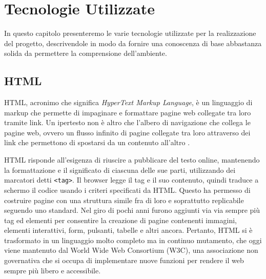 \clearpage{\pagestyle{empty}\cleardoublepage}
\chapter{Tecnologie Utilizzate}
In questo capitolo presenteremo le varie tecnologie utilizzate per la realizzazione del progetto, descrivendole in modo da fornire una conoscenza di base abbastanza solida da permettere la comprensione dell'ambiente.

\section{HTML}
HTML, acronimo che significa \textit{HyperText Markup Language}, è un linguaggio di markup che permette di impaginare e formattare pagine web collegate tra loro tramite link. Un ipertesto non è altro che l'albero di navigazione che collega le pagine web, ovvero un flusso infinito di pagine collegate tra loro attraverso dei link che permettono di spostarsi da un contenuto all'altro \cite{HTML, HTML_Mozilla}.

HTML risponde all'esigenza di riuscire a pubblicare del testo online, mantenendo la formattazione e il significato di ciascuna delle sue parti, utilizzando dei marcatori detti \Verb_<tag>_. Il browser legge il tag e il suo contenuto, quindi traduce a schermo il codice usando i criteri specificati da HTML. Questo ha permesso di costruire pagine con  una struttura simile fra di loro e soprattutto replicabile seguendo uno standard. Nel giro di pochi anni furono aggiunti via via sempre più tag ed elementi per consentire la creazione di pagine contenenti immagini, elementi interattivi, form, pulsanti, tabelle e altri ancora. Pertanto, HTML si è trasformato in un linguaggio molto completo ma in continuo mutamento, che oggi viene mantenuto dal World Wide Web Consortium (W3C), una associazione non governativa che si occupa di implementare nuove funzioni per rendere il web sempre più libero e accessibile.

